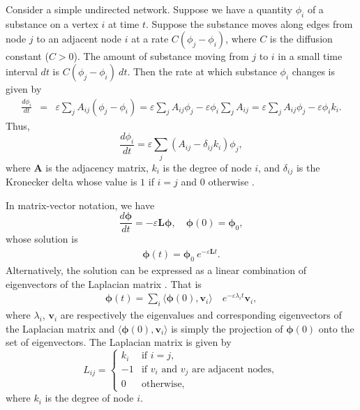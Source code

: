 \documentclass[12pt]{article}
\begin{document}
Consider a simple undirected network. Suppose we have a quantity $\phi_i$ of a substance on a vertex $i$ at time $t$. Suppose the substance moves along edges from node $j$ to an adjacent node $i$ at a rate $C(\phi_j -\phi_i)$, where $C$ is the diffusion constant ($C>0$). The amount of substance moving from $j$ to $i$ in a small time interval $dt$ is $C(\phi_j -\phi_i)~dt$. Then the rate at which substance $\phi_i$ changes is given by
\begin{eqnarray*}
	\frac{d\phi_i}{dt} &=& \varepsilon \sum_j A_{ij}(\phi_j - \phi_i) = \varepsilon \sum_j A_{ij} \phi_j - \varepsilon \phi_i \sum_j A_{ij} = \varepsilon \sum_j A_{ij} \phi_j - \varepsilon \phi_i k_i.
\end{eqnarray*}
Thus,
\begin{equation}
\frac{d\phi_i}{dt} = \varepsilon \sum_j (A_{ij} - \delta_{ij} k_i) \phi_j,
\label{difusion}
\end{equation}
where $\mathbf{A}$ is the adjacency matrix, $k_i$ is the degree of node $i$, and $\delta_{ij}$ is the Kronecker delta whose value is $1$ if $i=j$ and $0$ otherwise \citep{newman2010networks,ma2008mining,lopez2008diffusion}.
 
 In matrix-vector notation, we have
 \begin{equation}
 \frac{d\boldsymbol{\phi}}{dt} = -\varepsilon\mathbf{L}\boldsymbol{\phi}, \quad \boldsymbol{\phi}(0) = \boldsymbol{\phi}_0 ,
 \label{dif-final-eqn}
 \end{equation}
 whose solution is 
 \begin{eqnarray}
 \boldsymbol{\phi}(t) = \boldsymbol{\phi}_0~e^{-\varepsilon\mathbf{L}t}.
 \end{eqnarray}
 Alternatively, the solution can be expressed as a linear combination of eigenvectors of the Laplacian matrix \citep{edwards2004differential}. That is
 \begin{eqnarray*}
 	\boldsymbol{\phi}(t) = \sum_i \langle \boldsymbol{\phi}(0),\mathbf{v}_i \rangle \quad e^{-\varepsilon\lambda_i t} \mathbf{v}_i,  
 \end{eqnarray*}
 where $\lambda_i$, $\mathbf{v}_i$ are respectively the eigenvalues and corresponding eigenvectors of the Laplacian matrix and $\langle \boldsymbol{\phi}(0),\mathbf{v}_i \rangle$ is simply the projection of $\boldsymbol{\phi}(0)$ onto the set of eigenvectors. The Laplacian matrix is given by
 \begin{equation}
 L_{ij} = \begin{cases}
 k_i & \text{if } i=j, \\
 -1 & \text{if } v_i \text{ and } v_j \text{ are adjacent nodes},\\
 0 & \text{otherwise,}
 \end{cases}
 \end{equation}
 where $k_i$ is the degree of node $i$.
\end{document}
